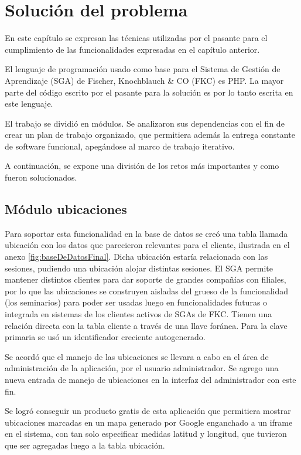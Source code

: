 ﻿\chapter{Solución del problema}
\thispagestyle{empty} %

En este capítulo se expresan las técnicas utilizadas por el pasante para el cumplimiento de las funcionalidades expresadas en el capítulo anterior.

El lenguaje de programación usado como base para el Sistema de Gestión de Aprendizaje (SGA) de Fischer, Knochblauch \& CO (FKC) es PHP. La mayor parte del código escrito por el pasante para la solución es por lo tanto escrita en este lenguaje.

El trabajo se dividió en módulos. Se analizaron sus dependencias con el fin de crear un plan de trabajo organizado, que permitiera además la entrega constante de software funcional, apegándose al marco de trabajo iterativo.

A continuación, se expone una división de los retos más importantes y como fueron solucionados.

	\section{Módulo ubicaciones} %
	\label{sec:ubicaciones}
	
	Para soportar esta funcionalidad en la base de datos se creó una tabla llamada ubicación con los datos que parecieron relevantes para el cliente, ilustrada en el anexo \ref{fig:baseDeDatosFinal}. Dicha ubicación estaría relacionada con las sesiones, pudiendo una ubicación alojar distintas sesiones. El SGA permite mantener distintos clientes para dar soporte de grandes compañías con filiales, por lo que las ubicaciones se construyen aisladas del grueso de la funcionalidad (los seminarios) para poder ser usadas luego en funcionalidades futuras o integrada en sistemas de los clientes activos de SGAs de FKC. Tienen una relación directa con la tabla cliente a través de una llave foránea. Para la clave primaria se usó un identificador creciente autogenerado.

	Se acordó que el manejo de las ubicaciones se llevara a cabo en el área de administración de la aplicación, por el usuario administrador. Se agrego una nueva entrada de manejo de ubicaciones en la interfaz del administrador con este fin.

	Se logró conseguir un producto gratis de esta aplicación que permitiera mostrar ubicaciones marcadas en un mapa generado por Google enganchado a un iframe en el sistema, con tan solo especificar medidas latitud y longitud, que tuvieron que ser agregadas luego a la tabla ubicación.

